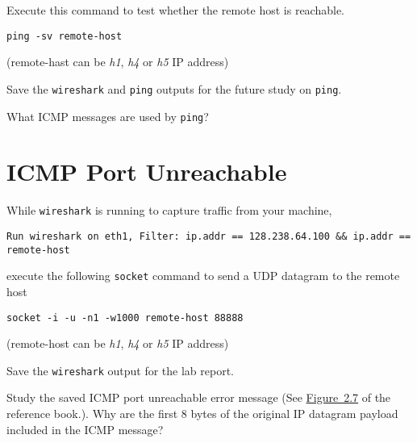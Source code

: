 \documentclass{UTNetLab}
\begin{document}
     Execute this command to test whether the remote host is reachable.
    
    \begin{lstlisting}[emph={remote-host}]
    ping -sv remote-host
    \end{lstlisting}
   
   (remote-hast can be \textit{h1}, \textit{h4} or \textit{h5} IP address)
    
    Save the \lstinline{wireshark} and \lstinline{ping} outputs for the future study on \lstinline{ping}.
    
    \begin{report}
        \item What ICMP messages are used by \lstinline{ping}?
    \end{report}

\section{ICMP Port Unreachable}
    While \lstinline{wireshark} is running to capture traffic from your machine,
    
    \begin{lstlisting}[emph={remote-host}]
    Run wireshark on eth1, Filter: ip.addr == 128.238.64.100 && ip.addr == remote-host
    \end{lstlisting}
    
 execute the following \lstinline{socket} command to send a UDP datagram to the remote host

    \begin{lstlisting}[emph={remote-host}]
    socket -i -u -n1 -w1000 remote-host 88888
    \end{lstlisting}
(remote-host can be \textit{h1}, \textit{h4} or \textit{h5} IP address)

    Save the \lstinline{wireshark} output for the lab report.

    \begin{report}
        \item Study the saved ICMP port unreachable error message (See \hyperref[fig:2.7]{Figure~2.7} of the reference book.).
            Why are the first 8 bytes of the original IP datagram payload included in the ICMP message?
    \end{report}
\end{document}
